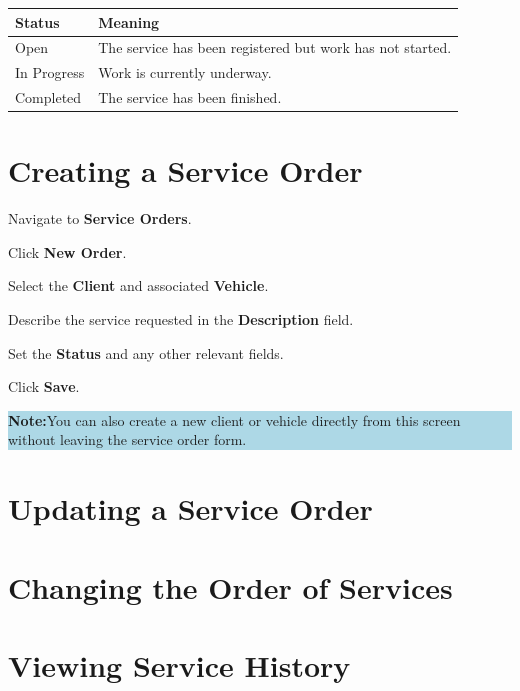 \documentclass[12pt, a4paper]{report}
\newcommand{\notebox}[1]{%
	\vspace{6pt}
	\noindent
	\colorbox{LightBlue}{%
		\begin{minipage}{\dimexpr\linewidth-2\fboxsep}%
			\vspace{5pt}
			\small\textbf{\color{Blue}Note:\space}\color{Navy}#1
			\vspace{5pt}
		\end{minipage}%
	}
	\vspace{6pt}
}
\newcommand{\ui}[1]{\textbf{\color{Navy}#1}}
\begin{document}
	\begin{tabularx}{\textwidth}{l X}
		\toprule
		\textbf{Status} & \textbf{Meaning} \\
		\midrule
		Open       & The service has been registered but work has not started. \\
		In Progress & Work is currently underway. \\
		Completed  & The service has been finished. \\
		\bottomrule
	\end{tabularx}
	
	\section{Creating a Service Order}
	
	\begin{steps}
		\item Navigate to \ui{Service Orders}.
		\item Click \ui{New Order}.
		\item Select the \ui{Client} and associated \ui{Vehicle}.
		\item Describe the service requested in the \ui{Description} field.
		\item Set the \ui{Status} and any other relevant fields.
		\item Click \ui{Save}.
	\end{steps}
	
	\notebox{You can also create a new client or vehicle directly from this
		screen without leaving the service order form.}
	
	\section{Updating a Service Order}
	
	\section{Changing the Order of Services}
	
	\section{Viewing Service History}
	
\end{document}
